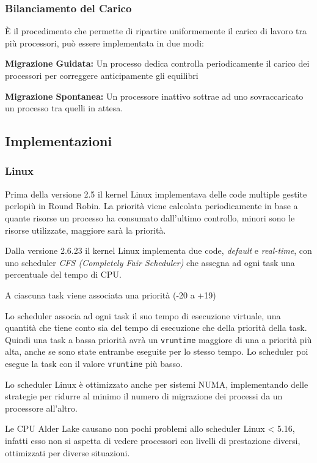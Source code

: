 \subsubsection*{Bilanciamento del Carico}
È il procedimento che permette di ripartire uniformemente il carico di lavoro tra più processori, può essere implementata in due modi:
\begin{sitemize}
    \item \textbf{Migrazione Guidata:} Un processo dedica controlla periodicamente il carico dei processori per correggere anticipamente gli equilibri
    \item \textbf{Migrazione Spontanea:} Un processore inattivo sottrae ad uno sovraccaricato un processo tra quelli in attesa.
\end{sitemize}

\subsection{Implementazioni}
\subsubsection{Linux}
Prima della versione 2.5 il kernel Linux implementava delle code multiple gestite perlopiù in Round Robin. La priorità viene calcolata periodicamente in base a quante risorse un processo ha consumato dall'ultimo controllo, minori sono le risorse utilizzate, maggiore sarà la priorità.

\spacer
Dalla versione 2.6.23 il kernel Linux implementa due code, \textit{default} e \textit{real-time}, con uno scheduler \textit{CFS (Completely Fair Scheduler)} che assegna ad ogni task una percentuale del tempo di CPU.

A ciascuna task viene associata una priorità (-20 a +19)

\spacer
Lo scheduler associa ad ogni task il suo tempo di esecuzione virtuale, una quantità che tiene conto sia del tempo di esecuzione che della priorità della task. Quindi una task a bassa priorità avrà un \texttt{vruntime} maggiore di una a priorità più alta, anche se sono state entrambe eseguite per lo stesso tempo.
Lo scheduler poi esegue la task con il valore \texttt{vruntime} più basso.

\spacer
Lo scheduler Linux è ottimizzato anche per sistemi NUMA, implementando delle strategie per ridurre al minimo il numero di migrazione dei processi da un processore all'altro.

\spacer
Le CPU Alder Lake causano non pochi problemi allo scheduler Linux < 5.16, infatti esso non si aspetta di vedere processori con livelli di prestazione diversi, ottimizzati per diverse situazioni.

